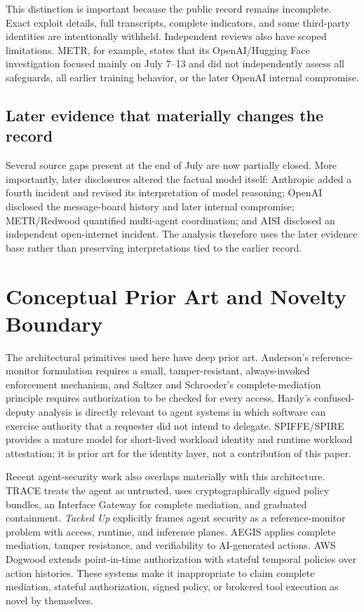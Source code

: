 \documentclass[11pt,letterpaper]{article}
\begin{document}
This distinction is important because the public record remains incomplete. Exact exploit details, full transcripts, complete indicators, and some third-party identities are intentionally withheld. Independent reviews also have scoped limitations. METR, for example, states that its OpenAI/Hugging Face investigation focused mainly on July 7--13 and did not independently assess all safeguards, all earlier training behavior, or the later OpenAI internal compromise.\cite{metr-hf}

\subsection{Later evidence that materially changes the record}
Several source gaps present at the end of July are now partially closed. More importantly, later disclosures altered the factual model itself: Anthropic added a fourth incident and revised its interpretation of model reasoning; OpenAI disclosed the message-board history and later internal compromise; METR/Redwood quantified multi-agent coordination; and AISI disclosed an independent open-internet incident. The analysis therefore uses the later evidence base rather than preserving interpretations tied to the earlier record.

\section{Conceptual Prior Art and Novelty Boundary}
The architectural primitives used here have deep prior art. Anderson's reference-monitor formulation requires a small, tamper-resistant, always-invoked enforcement mechanism, and Saltzer and Schroeder's complete-mediation principle requires authorization to be checked for every access.\cite{anderson1972,saltzer1975} Hardy's confused-deputy analysis is directly relevant to agent systems in which software can exercise authority that a requester did not intend to delegate.\cite{hardy1988} SPIFFE/SPIRE provides a mature model for short-lived workload identity and runtime workload attestation; it is prior art for the identity layer, not a contribution of this paper.\cite{spiffe-spire}

Recent agent-security work also overlaps materially with this architecture. TRACE treats the agent as untrusted, uses cryptographically signed policy bundles, an Interface Gateway for complete mediation, and graduated containment.\cite{trace2026} \emph{Tacked Up} explicitly frames agent security as a reference-monitor problem with access, runtime, and inference planes.\cite{tackedup2026} AEGIS applies complete mediation, tamper resistance, and verifiability to AI-generated actions.\cite{aegis2026} AWS Dogwood extends point-in-time authorization with stateful temporal policies over action histories.\cite{dogwood2026} These systems make it inappropriate to claim complete mediation, stateful authorization, signed policy, or brokered tool execution as novel by themselves.
\end{document}
